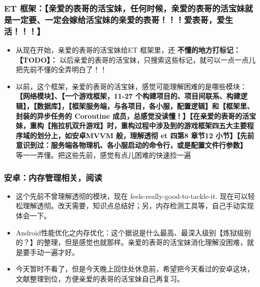 \documentclass[9pt, b5paper]{article}
\begin{document}
\subsubsection{ET 框架：【亲爱的表哥的活宝妹，任何时候，亲爱的表哥的活宝妹就是一定要、一定会嫁给活宝妹的亲爱的表哥！！！爱表哥，爱生活！！！】}
\label{sec-2-1-2}
\begin{itemize}
\item 从现在开始，亲爱的表哥的活宝妹给ET 框架里，还 \textbf{不懂的地方打标记：【TODO】：} 以后亲爱的表哥的活宝妹，只搜索这些标记，就可以一点一点儿把先前不懂的全弄明白了！！
\item 以前，这个框架，亲爱的表哥的活宝妹，感觉可能理解困难的是哪些模块： \textbf{【网络模块】、【一个游戏框架，11-27 个构建项目的、项目间联系、构建逻辑】，【数据库】，【框架服务端，与各项目，各小服，配置逻辑】和【框架里、封装的异步任务的 Coroutine 成员，总感觉没读懂！】【在亲爱的表哥的活宝妹，重构【拖拉机双升游戏】时，重构过程中涉及到的游戏框架四五大主要程序域的划分上，如安卓MVVM 般，理解透彻 et 四第8 章节12 小节】【先前意识到过：服务端各物理机、各小服启动的命令行，或是配置文件行参数】} 等一一弄懂。把这些先前，感觉有点儿困难的快速捡一遍
\end{itemize}
\subsubsection{安卓：内存管理相关，阅读}
\label{sec-2-1-3}
\begin{itemize}
\item 这个先前不曾理解透彻的模块，现在 feels-really-good-to-tackle-it. 现在可以轻松理解透彻。改天需要，知识点总结好；另，内存检测工具等，自己手动实现体会一下。
\item Android性能优化之内存优化：这个据说是什么最高、最深入级别【炼狱级别的？】的整理，但是感觉也就那样。亲爱的表哥的活宝妹消化理解没困难，就是要手动一遍才好。
\item 今天暂时不看了，但是今天晚上回住处休息前，希望把今天看过的安卓这块，文献整理到位，方便亲爱的表哥的活宝妹自己再复习。
\end{itemize}
\end{document}
